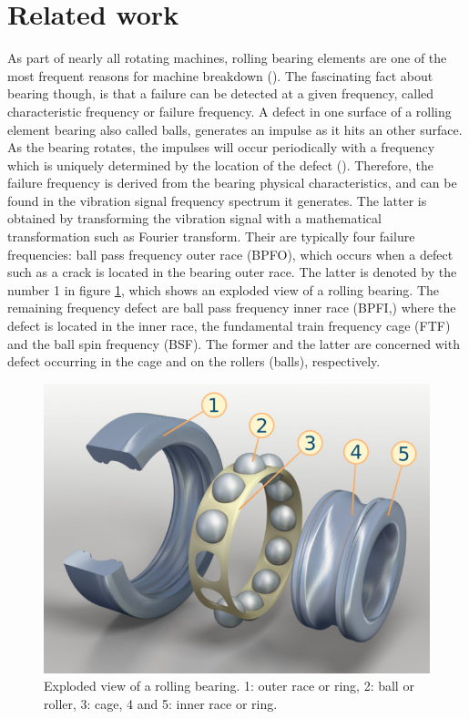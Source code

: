 \documentclass[../Main/thesis.tex]{subfiles}
\begin{document}
\section{Related work}
\label{sec:relatedwork}
As part of nearly all rotating machines, rolling bearing elements are one of the most frequent reasons for machine breakdown (\cite{randal2010}). The fascinating fact about bearing though, is that a failure can be detected at a given frequency, called characteristic frequency or failure frequency. A defect in one surface of a rolling element bearing also called balls, generates an impulse as it hits an other surface. As the bearing rotates, the impulses will occur periodically with a frequency which is uniquely determined by the location of the defect (\cite{mcfadden1984}). Therefore, the failure frequency
is derived from the bearing physical characteristics, and can be found in the vibration signal frequency spectrum it generates. The latter is obtained by transforming the vibration signal with a mathematical transformation such as Fourier transform. 
\justify
Their are typically four failure frequencies: ball pass frequency outer race (BPFO), which occurs when a defect such as a crack is located in the bearing outer race. The latter is denoted by the number 1 in figure \ref{fig:bearing-s}, which shows an exploded view of a rolling bearing. The remaining frequency defect are ball pass frequency inner race (BPFI,) where the defect is located in the inner race, the fundamental train frequency cage (FTF) and the ball spin frequency (BSF). The former and the latter are concerned with defect occurring in the cage and on the rollers (balls), respectively. 
 
\begin{figure}[H]
	\centering
	\includegraphics[width=0.5\linewidth]{../fig/bearing-s}
	\caption{Exploded view of a rolling bearing. 1: outer race or ring, 2: ball or roller, 3: cage, 4 and 5: inner race or ring.}
	\label{fig:bearing-s}
\end{figure}
\end{document}

